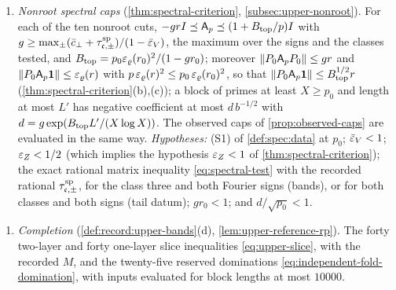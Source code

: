 \begin{enumerate}[label=\textup{(F\arabic*)}]
 \emph{(b) Schur rows (tail datum).} With moreover the pointwise marginal ratio
 $\ell_{\rm mar}$ of the field records (from \ref{it:record:upper-F1} and
 \cref{lem:four-count} with $M$ the middle row and $S$ an outer row; its hypothesis,
 that the $\rm F$ and $\rm E$ graphs induce the same graph on $M\cup S$, is
 \cref{lem:upper-geometry}(d)) and the correlations $\rho_{\rm F},\rho_{\rm E}$ of
 \ref{it:record:upper-F4}, all at $p_0$, put $R_{\rm m}=\exp(\bar n\ell_{\rm mar})$. Then
 \[
  f_{\rm Schur}=\frac{HR_{\rm m}\rho_{\rm F}+(H+50H^2)\upsilon^2}{r_0},\qquad
  h=\frac{\rho_{\rm E}}{r_0}
 \]
 are valid row coefficients (\cref{lem:five-type}(c) with
 \cref{rem:five-type-fold-data} at $t_{\rm Y}=1/50$), and so is the full-norm
 coefficient $f=[H(R_{\rm m}\rho_{\rm F}+2\upsilon+\upsilon^2)+H-1]/r_0$ of
 \cref{lem:row-comparison}(b) with \cref{lem:five-type}(b); the smaller of the two is
 used.

 \emph{Hypotheses:} in (a), $M\ge H+t_{\rm Y}$ and
 $t_{\rm Y}H<1$ for the matching ratio $M=w_{\rm S}/w_{\rm D}$,
 $c_{\rm F}r_0<1$, and the prime gates of the table at its
 endpoint; in (b) the weaker $t_{\rm Y}\le H^{-1}$ suffices, and
 with $M=21/20$ and $t_{\rm Y}=1/50$ both hypotheses follow from
 $H\le103/100$.
\item\label{it:record:upper-F6} \emph{Nonroot spectral caps}
 (\cref{thm:spectral-criterion}, \cref{subsec:upper-nonroot}). For each of the ten
 nonroot cuts, $-grI\preceq\mathsf A_p\preceq(1+B_{\rm top}/p)I$ with
 $g\ge\max_\pm(\bar c_{\perp}+\tau^{\rm sp}_{\mathfrak c,\pm})/(1-\bar{\varepsilon}_V)$, the maximum over
 the signs and the classes tested, and $B_{\rm top}=p_0\varepsilon_\varrho(r_0)^2/(1-gr_0)$;
 moreover $\left\|P_0\mathsf A_p P_0\right\|\le gr$ and
 $\left\|P_0\mathsf A_p\mathbf 1\right\|\le\varepsilon_\varrho(r)$ with $p\,\varepsilon_\varrho(r)^2\le p_0\,\varepsilon_\varrho(r_0)^2$,
 so that $\left\|P_0\mathsf A_p\mathbf 1\right\|\le B_{\rm top}^{1/2}r$ (\cref{thm:spectral-criterion}(b),(c));
 a block of primes at least $X\ge p_0$
 and length at most $L'$ has negative coefficient at most $d\,b^{-1/2}$ with
 $d=g\exp(B_{\rm top}L'/(X\log X))$. The observed caps of \cref{prop:observed-caps}
 are evaluated in the same way. \emph{Hypotheses:} (S1) of \cref{def:spec:data}
 at $p_0$; $\bar{\varepsilon}_V<1$; $\varepsilon_Z<1/2$ (which implies the hypothesis $\varepsilon_Z<1$ of
 \cref{thm:spectral-criterion}); the exact rational matrix inequality
 \eqref{eq:spectral-test} with the recorded rational $\tau^{\rm sp}_{\mathfrak c,\pm}$,
 for the class three and both Fourier signs (bands), or for both classes and both
 signs (tail datum); $gr_0<1$; and $d/\sqrt{p_0}<1$.
\end{enumerate}
\begin{enumerate}[label=\textup{(F\arabic*)},start=10]
\item\label{it:record:upper-F10} \emph{Completion} (\cref{def:record:upper-bands}(d),
 \cref{lem:upper-reference-rp}). The forty two-layer and forty one-layer slice
 inequalities \eqref{eq:upper-slice}, with the recorded $M$, and the twenty-five
 reserved dominations \eqref{eq:independent-fold-domination}, with inputs evaluated
 for block lengths at most $10000$.
\end{enumerate}

